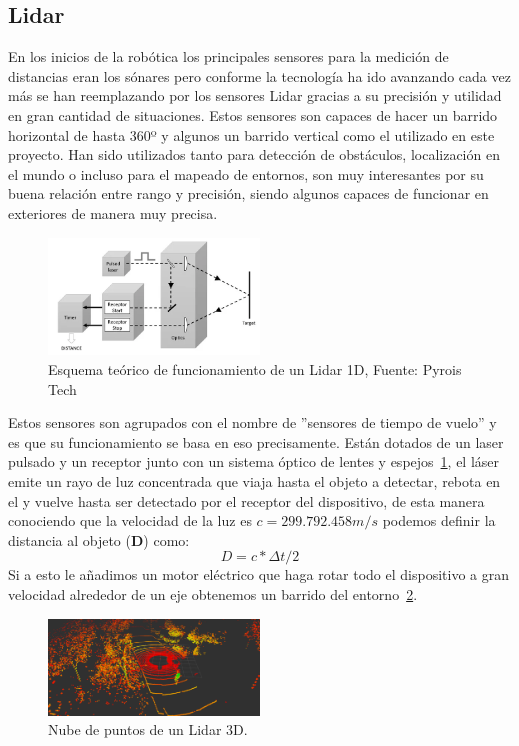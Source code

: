 \subsection{Lidar}
En los inicios de la robótica los principales sensores para la medición de distancias eran los sónares pero conforme la tecnología ha ido avanzando 
cada vez más se han reemplazando por los sensores Lidar gracias a su precisión y utilidad en gran cantidad de situaciones. 
Estos sensores son capaces de hacer un barrido horizontal de hasta 360º y algunos un barrido vertical como el utilizado en este proyecto. 
Han sido utilizados tanto para detección de obstáculos, localización en el mundo o incluso para el mapeado de entornos, son muy interesantes 
por su buena relación entre rango y precisión, siendo algunos capaces de funcionar en exteriores de manera muy precisa.

\begin{figure}[H]
    \centering
    \includegraphics[width=0.5\textwidth]{images/lidar_explicacion.png}
    \caption{Esquema teórico de funcionamiento de un Lidar 1D, Fuente: Pyrois Tech}
    \label{fig:lidar_explicacion}
\end{figure}

Estos sensores son agrupados con el nombre de ''sensores de tiempo de vuelo'' y es que su funcionamiento se basa en eso precisamente. Están 
dotados de un laser pulsado y un receptor junto con un sistema óptico de lentes y espejos~\ref{fig:lidar_explicacion}, el láser emite un rayo de luz concentrada que viaja 
hasta el objeto a detectar, rebota en el y vuelve hasta ser detectado por el receptor del dispositivo, de esta manera conociendo que la 
velocidad de la luz es \begin{math}c=299.792.458 m/s\end{math} podemos definir la distancia al objeto (\textbf{D}) como:~$$D = c * \Delta{t} / 2$$ Si a esto 
le añadimos un motor eléctrico que haga rotar todo el dispositivo a gran velocidad alrededor de un eje obtenemos un 
barrido del entorno~\ref{fig:lidar3d}.


\begin{figure}[h]
    \centering
    \includegraphics[width=0.5\textwidth]{images/lidar3d_1.png}
    \caption{Nube de puntos de un Lidar 3D.}
    \label{fig:lidar3d}
\end{figure}

